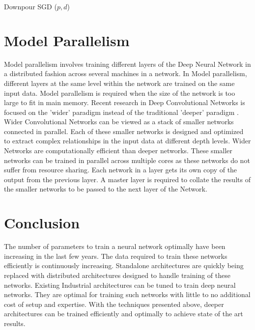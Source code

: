 \documentclass[sigconf]{acmart}
\begin{document}
\begin{algorithm}[htbp]

\caption{Downpour SGD ($p,d$)}\label{DownpourSGD}

\begin{algorithmic}[1]

\EndFor
\end{algorithmic}

\end{algorithm}



\section{Model Parallelism} \label{layer}

Model parallelism involves training different layers of the Deep Neural Network in a distributed fashion across several machines in a network. In Model parallelism, different layers at the same level within the network are trained on the same input data. Model parallelism is required when the size of the network is too large to fit in main memory. Recent research in Deep Convolutional Networks is focused on the 'wider' paradigm instead of the traditional 'deeper' paradigm \cite{Googlenet}. Wider Convolutional Networks can be viewed as a stack of smaller networks connected in parallel. Each of these smaller networks is designed and optimized to extract complex relationships in the input data at different depth levels. Wider Networks are computationally efficient than deeper networks. These smaller networks can be trained in parallel across multiple cores as these networks do not suffer from resource sharing. Each network in a layer gets its own copy of the output from the previous layer. A master layer is required to collate the results of the smaller networks to be passed to the next layer of the Network.


\section{Conclusion}

The number of parameters to train a neural network optimally have been increasing in the last few years. The data required to train these networks efficiently is continuously increasing. Standalone architectures are quickly being replaced with distributed architectures designed to handle training of these networks. Existing Industrial architectures can be tuned to train deep neural networks. They are optimal for training such networks with little to no additional cost of setup and expertise. With the techniques presented above, deeper architectures can be trained efficiently and optimally to achieve state of the art results.


 
\end{document}
